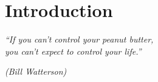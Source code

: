 \documentclass[tcc]{subfiles}
\begin{document}
\chapter{Introduction}
\epigraph{\em ``If you can't control your peanut butter,\\ you can't expect to
control your life.''}{\em(Bill Watterson)}
\end{document}
